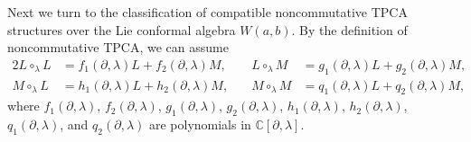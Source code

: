 \documentclass[11pt,letterpaper,reqno]{amsart}
\theoremstyle{definition}
\numberwithin{equation}{section}
\begin{document}
Next we turn to the classification of compatible noncommutative TPCA structures over the Lie conformal algebra $W(a,b)$.
By the definition of noncommutative TPCA, we can assume
\begin{alignat}{2}
L\circ_\lambda L&=f_1(\partial, \lambda)L+f_2(\partial, \lambda)M,&\quad L\circ_\lambda M&=g_1(\partial, \lambda)L+g_2(\partial, \lambda)M,\label{ly4}\\
M\circ_\lambda L&=h_1(\partial, \lambda)L+h_2(\partial, \lambda)M,&\quad M\circ_\lambda M&=q_1(\partial, \lambda)L+q_2(\partial, \lambda)M,\label{ly5}
\end{alignat}
where $f_1(\partial, \lambda)$, $f_2(\partial, \lambda)$, $g_1(\partial, \lambda)$, $g_2(\partial, \lambda)$,
$h_1(\partial, \lambda)$, $h_2(\partial, \lambda)$, $q_1(\partial, \lambda)$, and $q_2(\partial, \lambda)$ are polynomials in $\mathbb{C}[\partial,\lambda]$.
\end{document}

